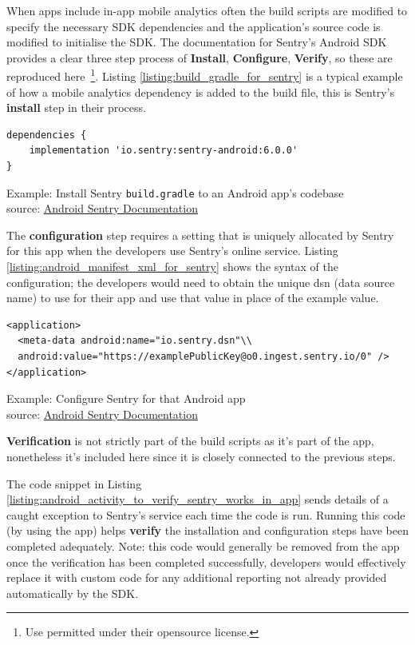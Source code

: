 When apps include in-app mobile analytics often the build scripts are modified to specify the necessary SDK dependencies and the application's source code is modified to initialise the SDK. The documentation for Sentry's Android SDK provides a clear three step process of \textbf{Install}, \textbf{Configure}, \textbf{Verify}, so these are reproduced here~\footnote{Use permitted under their opensource license.}. Listing \ref{listing:build_gradle_for_sentry} is a typical example of how a mobile analytics dependency is added to the build file, this is Sentry's \textbf{install} step in their process.

\begin{listing}
\begin{verbatim}
dependencies {
    implementation 'io.sentry:sentry-android:6.0.0'
}
\end{verbatim}
\caption{Example: Install Sentry \texttt{build.gradle} to an Android app's codebase\\source: \href{https://docs.sentry.io/platforms/android/}{Android Sentry Documentation}}
\label{listing:build_gradle_for_sentry}
\end{listing}

The \textbf{configuration} step requires a setting that is uniquely allocated by Sentry for this app when the developers use Sentry's online service. Listing \ref{listing:android_manifest_xml_for_sentry} shows the syntax of the configuration; the developers would need to obtain the unique dsn (data source name) to use for their app and use that value in place of the example value.

\begin{listing}
\begin{verbatim}
<application>
  <meta-data android:name="io.sentry.dsn"\\
  android:value="https://examplePublicKey@o0.ingest.sentry.io/0" />
</application>
\end{verbatim}
\caption{Example: Configure Sentry for that Android app\\source: \href{https://docs.sentry.io/platforms/android/}{Android Sentry Documentation}}
\label{listing:android_manifest_xml_for_sentry}
\end{listing}

\textbf{Verification} is not strictly part of the build scripts as it's part of the app, nonetheless it's included here since it is closely connected to the previous steps.

The code snippet in Listing \ref{listing:android_activity_to_verify_sentry_works_in_app} sends details of a caught exception to Sentry's service each time the code is run. Running this code (by using the app) helps \textbf{verify} the installation and configuration steps have been completed adequately. Note: this code would generally be removed from the app once the verification has been completed successfully, developers would effectively replace it with custom code for any additional reporting not already provided automatically by the SDK. %

